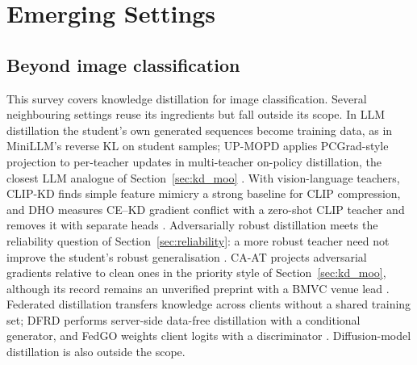 \section{Emerging Settings}
\label{sec:emerging}

\subsection{Beyond image classification}

This survey covers knowledge distillation for image classification. Several neighbouring settings reuse its ingredients but fall outside its scope. In LLM distillation the student's own generated sequences become training data, as in MiniLLM's reverse KL on student samples; UP-MOPD applies PCGrad-style projection to per-teacher updates in multi-teacher on-policy distillation, the closest LLM analogue of Section~\ref{sec:kd_moo} \citep{gu2024minillm,zhu2026upmopd}. With vision-language teachers, CLIP-KD finds simple feature mimicry a strong baseline for CLIP compression, and DHO measures CE--KD gradient conflict with a zero-shot CLIP teacher and removes it with separate heads \citep{yang2024clipkd,kang2025dho}. Adversarially robust distillation meets the reliability question of Section~\ref{sec:reliability}: a more robust teacher need not improve the student's robust generalisation \citep{lee2026robustteachers}. CA-AT projects adversarial gradients relative to clean ones in the priority style of Section~\ref{sec:kd_moo}, although its record remains an unverified preprint with a BMVC venue lead \citep{xue2024caat}. Federated distillation transfers knowledge across clients without a shared training set; DFRD performs server-side data-free distillation with a conditional generator, and FedGO weights client logits with a discriminator \citep{luo2023dfrd,jang2025fedgo}. Diffusion-model distillation is also outside the scope.
